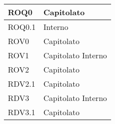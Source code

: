 \documentclass[../AnalisideiRequisiti.tex]{subfiles}
\begin{document}
\begin{longtable}{| p{4cm} | p{4cm} |}
\newline ROQ0&\newline Capitolato
\\[1em]
\hline
\newline ROQ0.1&\newline Interno
\\[1em]
\hline
\newline ROV0&\newline Capitolato
\\[1em]
\hline	
\newline 
ROV1&\newline Capitolato \newline Interno
\\[1em]
\hline
\newline 
ROV2&\newline Capitolato
\\[1em]
\hline
\newline
RDV2.1&\newline Capitolato
\\[1em]
\hline
\newline
RDV3&\newline Capitolato \newline Interno
\\[1em]
\hline	
\newline
RDV3.1&\newline Capitolato
\\[1em]
\hline
\end{longtable}
\end{document}
